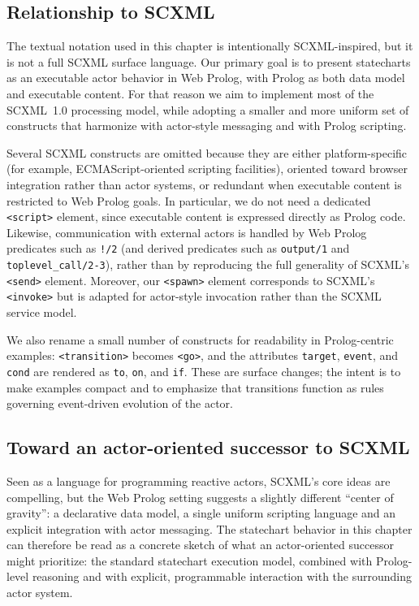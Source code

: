 \subsection{Relationship to SCXML}\label{sec:relationship-scxml}

The textual notation used in this chapter is intentionally SCXML-inspired, but it is not a full SCXML surface language. Our primary goal is to present statecharts as an executable actor behavior in Web Prolog, with Prolog as both data model and executable content. For that reason we aim to implement most of the SCXML~1.0 processing model, while adopting a smaller and more uniform set of constructs that harmonize with actor-style messaging and with Prolog scripting.

Several SCXML constructs are omitted because they are either platform-specific (for example, ECMAScript-oriented scripting facilities), oriented toward browser integration rather than actor systems, or redundant when executable content is restricted to Web Prolog goals. In particular, we do not need a dedicated \texttt{<script>} element, since executable content is expressed directly as Prolog code. Likewise, communication with external actors is handled by Web Prolog predicates such as \texttt{!/2} (and derived predicates such as \texttt{output/1} and \texttt{toplevel\_call/2-3}), rather than by reproducing the full generality of SCXML's \texttt{<send>} element. Moreover, our \texttt{<spawn>} element corresponds to SCXML's \texttt{<invoke>} but is adapted for actor-style invocation rather than the SCXML service model.

We also rename a small number of constructs for readability in Prolog-centric examples: \texttt{<transition>} becomes \texttt{<go>}, and the attributes \texttt{target}, \texttt{event}, and \texttt{cond} are rendered as \texttt{to}, \texttt{on}, and \texttt{if}. These are surface changes; the intent is to make examples compact and to emphasize that transitions function as rules governing event-driven evolution of the actor. 

\subsection{Toward an actor-oriented successor to SCXML}\label{sec:toward-successor-scxml}

Seen as a language for programming reactive actors, SCXML's core ideas are compelling, but the Web Prolog setting suggests a slightly different ``center of gravity'': a declarative data model, a single uniform scripting language and an explicit integration with actor messaging. The statechart behavior in this chapter can therefore be read as a concrete sketch of what an actor-oriented successor might prioritize: the standard statechart execution model, combined with Prolog-level reasoning and with explicit, programmable interaction with the surrounding actor system.

